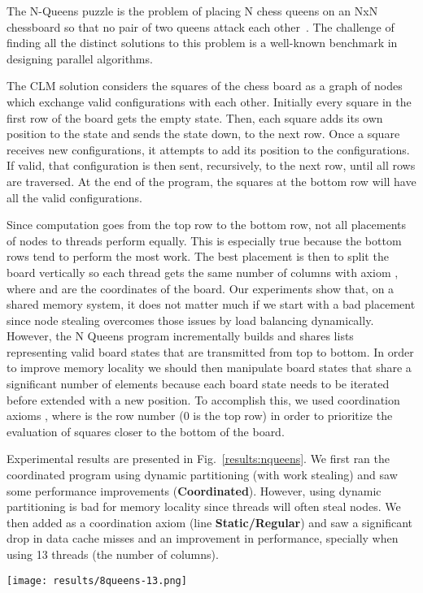 The N-Queens puzzle is the problem of placing N chess queens on an NxN
chessboard so that no pair of two queens attack each
other~\cite{8queens}. The challenge of finding all the
distinct solutions to this problem is a well-known benchmark in designing
parallel algorithms.

The CLM solution considers the squares of the chess board as a graph
of nodes which exchange valid configurations with each
other. Initially every square in the first row of the board gets the
empty state.  Then, each square adds its own position to the state and
sends the state down, to the next row. Once a square receives new
configurations, it attempts to add its position to the
configurations. If valid, that configuration is then sent,
recursively, to the next row, until all rows are traversed. At the end
of the program, the squares at the bottom row will have all the valid
configurations.

Since computation goes from the top row to the bottom row, not all
placements of nodes to threads perform equally. This is especially
true because the bottom rows tend to perform the most work. The best
placement is then to split the board vertically so each thread gets
the same number of columns with axiom , where
 and  are the coordinates of the board. Our experiments show that, on a shared
memory system, it does not matter much if we start with a bad
placement since node stealing overcomes those issues by load balancing
dynamically.  However, the N Queens program incrementally builds and shares lists representing
valid board states that are transmitted from top to bottom.
In order to improve memory locality we should then manipulate board
states that share a significant number of elements because each board state
needs to be iterated before extended with a new position.
To accomplish this, we used coordination axioms , where  is the row number (0 is the top row) in order to
prioritize the evaluation of squares closer to the bottom of the board.

Experimental results are presented in Fig.~\ref{results:nqueens}.  We
first ran the coordinated program using dynamic partitioning (with
work stealing) and saw some performance improvements
(\textbf{Coordinated}). However, using dynamic partitioning is bad for
memory locality since threads will often steal nodes.  We then
added  as a coordination axiom (line
\textbf{Static/Regular}) and saw a significant drop in data cache misses and an
improvement in performance, specially when using 13 threads (the number of
columns).

\begin{topfig}
   \begin{center}
      \texttt{[image: results/8queens-13.png]}
   \end{center}
\end{topfig}
